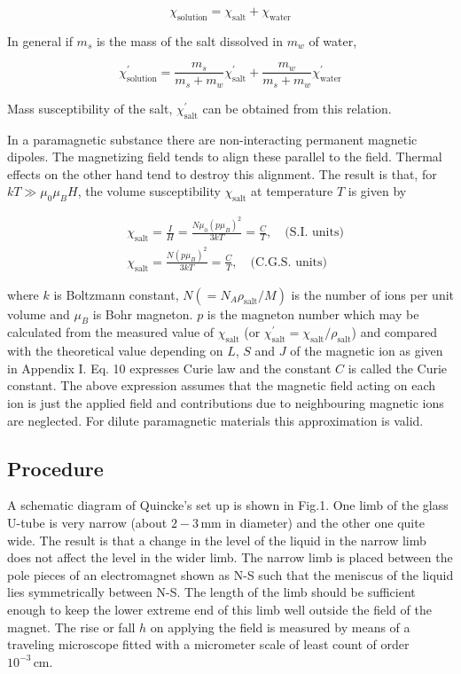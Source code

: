 \documentclass[%
 sor,
 jor,
 amsmath,amssymb,
 reprint,
]{revtex4-2}
\begin{document}
\begin{equation}
	\boxed { \chi_{\text{solution}} = \chi_{\text{salt}} + \chi_{\text{water}}}
\end{equation}

In general if $m_{s}$ is the mass of the salt dissolved in $m_{w}$ of water,

\begin{equation}
	\boxed{\chi_{\text{solution}}^{\prime} = \frac{m_{s}}{m_{s} + m_{w}} \chi_{\text{salt}}^{\prime} + \frac{m_{w}}{m_{s} + m_{w}} \chi_{\text{water}}^{\prime}}
\end{equation}

Mass susceptibility of the salt, $\chi_{\text{salt}}^{\prime}$ can be obtained from this relation.

In a paramagnetic substance there are non-interacting permanent magnetic dipoles. The magnetizing field tends to align these parallel to the field. Thermal effects on the other hand tend to destroy this alignment. The result is that, for $k T \gg \mu_{0} \mu_{B} H$, the volume susceptibility $\chi_{\text{salt}}$ at temperature $T$ is given by

\begin{align}
& \chi_{\text{salt}} = \frac{I}{H} = \frac{N \mu_{0} (p \mu_{B})^{2}}{3 k T} = \frac{C}{T}, \quad \text{(S.I. units)} \\
& \chi_{\text{salt}} = \frac{N (p \mu_{B})^{2}}{3 k T} = \frac{C}{T}, \quad \text{(C.G.S. units)}
\end{align}

where $k$ is Boltzmann constant, $N (= N_{A} \rho_{\text{salt}} / M)$ is the number of ions per unit volume and $\mu_{B}$ is Bohr magneton. $p$ is the magneton number which may be calculated from the measured value of $\chi_{\text{salt}}$ (or $\chi^{\prime}_{\text{salt}} = \chi_{\text{salt}} / \rho_{\text{salt}}$) and compared with the theoretical value depending on $L$, $S$ and $J$ of the magnetic ion as given in Appendix I. Eq. 10 expresses Curie law and the constant $C$ is called the Curie constant. The above expression assumes that the magnetic field acting on each ion is just the applied field and contributions due to neighbouring magnetic ions are neglected. For dilute paramagnetic materials this approximation is valid.



\subsection{Procedure}
A schematic diagram of Quincke's set up is shown in Fig.1. One limb of the glass U-tube is very narrow (about $2-3 \, \mathrm{mm}$ in diameter) and the other one quite wide. The result is that a change in the level of the liquid in the narrow limb does not affect the level in the wider limb. The narrow limb is placed between the pole pieces of an electromagnet shown as N-S such that the meniscus of the liquid lies symmetrically between N-S. The length of the limb should be sufficient enough to keep the lower extreme end of this limb well outside the field of the magnet. The rise or fall $h$ on applying the field is measured by means of a traveling microscope fitted with a micrometer scale of least count of order $10^{-3} \, \mathrm{cm}$.
\end{document}
